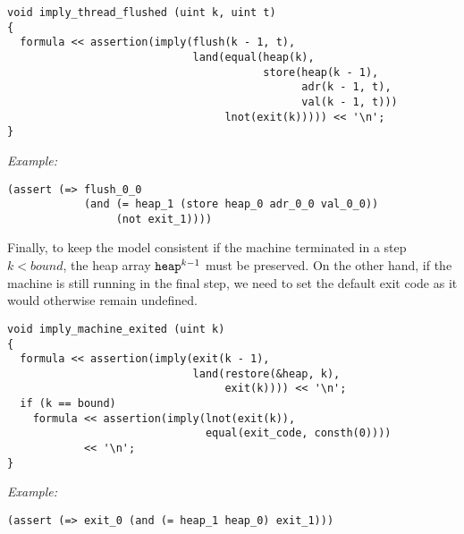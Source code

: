 \begin{lstlisting}[style=c++]
void imply_thread_flushed (uint k, uint t)
{
  formula << assertion(imply(flush(k - 1, t),
                             land(equal(heap(k),
                                        store(heap(k - 1),
                                              adr(k - 1, t),
                                              val(k - 1, t)))
                                  lnot(exit(k))))) << '\n';
}
\end{lstlisting}

\noindent
\emph{Example:} 

\begin{lstlisting}[style=smtlib]
(assert (=> flush_0_0
            (and (= heap_1 (store heap_0 adr_0_0 val_0_0))
                 (not exit_1))))
\end{lstlisting}


\noindent
Finally, to keep the model consistent if the machine terminated in a step $k < bound$, the heap array $\texttt{heap}^{k - 1}$ must be preserved.
On the other hand, if the machine is still running in the final step,
we need to set the default exit code as it would otherwise remain undefined.

\begin{lstlisting}[style=c++]
void imply_machine_exited (uint k)
{
  formula << assertion(imply(exit(k - 1),
                             land(restore(&heap, k),
                                  exit(k)))) << '\n';
  if (k == bound)
    formula << assertion(imply(lnot(exit(k)),
                               equal(exit_code, consth(0))))
            << '\n';
}
\end{lstlisting}

\noindent
\emph{Example:} 

\begin{lstlisting}[style=smtlib]
(assert (=> exit_0 (and (= heap_1 heap_0) exit_1)))
\end{lstlisting}

